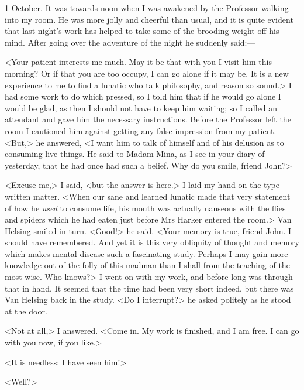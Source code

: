 \begin{diary}{1 October.}
It was towards noon when I was awakened by the Professor walking into my room. He was more jolly and cheerful than usual, and it is quite evident that last night's work has helped to take some of the brooding weight off his mind. After going over the adventure of the night he suddenly said:—

<Your patient interests me much. May it be that with you I visit him this morning? Or if that you are too occupy, I can go alone if it may be. It is a new experience to me to find a lunatic who talk philosophy, and reason so sound.> I had some work to do which pressed, so I told him that if he would go alone I would be glad, as then I should not have to keep him waiting; so I called an attendant and gave him the necessary instructions. Before the Professor left the room I cautioned him against getting any false impression from my patient. <But,> he answered, <I want him to talk of himself and of his delusion as to consuming live things. He said to Madam Mina, as I see in your diary of yesterday, that he had once had such a belief. Why do you smile, friend John?>

<Excuse me,> I said, <but the answer is here.> I laid my hand on the type-written matter. <When our sane and learned lunatic made that very statement of how he \textit{used} to consume life, his mouth was actually nauseous with the flies and spiders which he had eaten just before Mrs Harker entered the room.> Van Helsing smiled in turn. <Good!> he said. <Your memory is true, friend John. I should have remembered. And yet it is this very obliquity of thought and memory which makes mental disease such a fascinating study. Perhaps I may gain more knowledge out of the folly of this madman than I shall from the teaching of the most wise. Who knows?> I went on with my work, and before long was through that in hand. It seemed that the time had been very short indeed, but there was Van Helsing back in the study. <Do I interrupt?> he asked politely as he stood at the door.

<Not at all,> I answered. <Come in. My work is finished, and I am free. I can go with you now, if you like.>

<It is needless; I have seen him!>

<Well?>


\end{diary}
